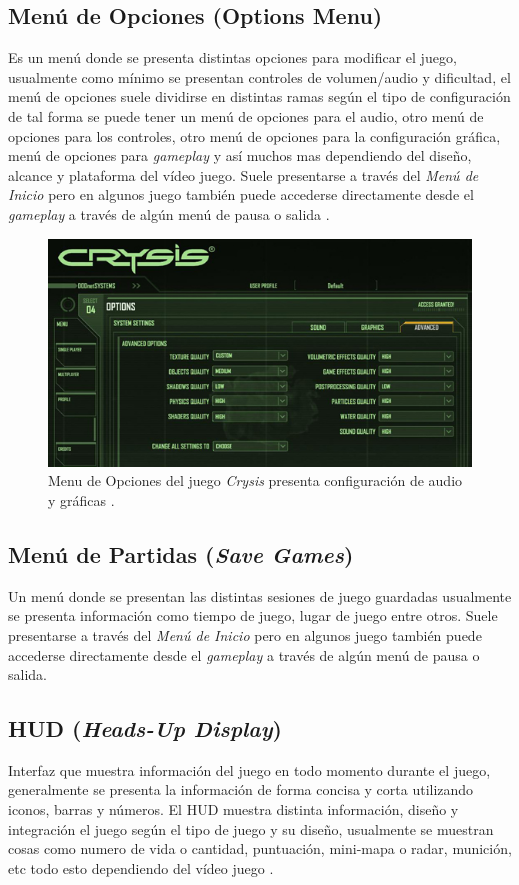 \subsection{Menú de Opciones (Options Menu)}
Es un menú donde se presenta distintas opciones para modificar el juego, usualmente como mínimo se presentan controles de volumen/audio y dificultad, el menú de opciones suele dividirse en distintas ramas según el tipo de configuración de tal forma se puede tener un menú de opciones para el audio, otro menú de opciones para los controles, otro menú de opciones para la configuración gráfica, menú de opciones para \emph{gameplay} y así muchos mas dependiendo del diseño, alcance y plataforma del vídeo juego. Suele presentarse a través del \emph{Menú de Inicio} pero en algunos juego también puede accederse directamente desde el \emph{gameplay} a través de algún menú de pausa o salida \cite{gb_optionsmenu}.~\\

\begin{figure}[H]
\centering
\includegraphics[width=0.95\linewidth]{media/crysis_opmenu.jpg} 
\caption{Menu de Opciones del juego \emph{Crysis} presenta configuración de audio y gráficas \cite{crysis}.}
\end{figure}

\subsection{Menú de Partidas (\emph{Save Games})}
Un menú donde se presentan las distintas sesiones de juego guardadas usualmente se presenta información como tiempo de juego, lugar de juego entre otros. Suele presentarse a través del \emph{Menú de Inicio} pero en algunos juego también puede accederse directamente desde el \emph{gameplay} a través de algún menú de pausa o salida.

\subsection{HUD (\emph{Heads-Up Display})}
Interfaz que muestra información del juego en todo momento durante el juego, generalmente se presenta la información de forma concisa y corta utilizando iconos, barras y números. El HUD muestra distinta información, diseño y integración el juego según el tipo de juego y su diseño, usualmente se muestran cosas como numero de vida o cantidad, puntuación, mini-mapa o radar, munición, etc todo esto dependiendo del vídeo juego \cite{huds}.~\\

